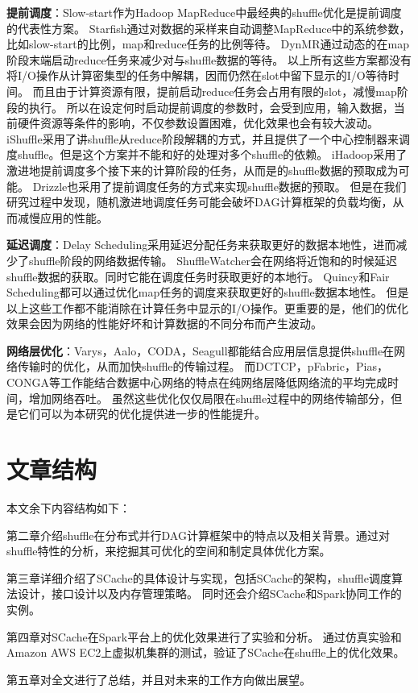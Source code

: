 \textbf{提前调度}：Slow-start作为Hadoop MapReduce\cite{hadoop}中最经典的shuffle优化是提前调度的代表性方案。
Starfish\cite{starfish}通过对数据的采样来自动调整MapReduce中的系统参数，比如slow-start的比例，map和reduce任务的比例等待。
DynMR\cite{dynmr}通过动态的在map阶段末端启动reduce任务来减少对与shuffle数据的等待。
以上所有这些方案都没有将I/O操作从计算密集型的任务中解耦，因而仍然在slot中留下显示的I/O等待时间。
而且由于计算资源有限，提前启动reduce任务会占用有限的slot，减慢map阶段的执行。
所以在设定何时启动提前调度的参数时，会受到应用，输入数据，当前硬件资源等条件的影响，不仅参数设置困难，优化效果也会有较大波动。
iShuffle\cite{ishuffle}采用了讲shuffle从reduce阶段解耦的方式，并且提供了一个中心控制器来调度shuffle。但是这个方案并不能和好的处理对多个shuffle的依赖。
iHadoop\cite{ihadoop}采用了激进地提前调度多个接下来的计算阶段的任务，从而是的shuffle数据的预取成为可能。
Drizzle\cite{drizzle}也采用了提前调度任务的方式来实现shuffle数据的预取。
但是在我们研究过程中发现，随机激进地调度任务可能会破坏DAG计算框架的负载均衡，从而减慢应用的性能。

\textbf{延迟调度}：Delay Scheduling\cite{delay}采用延迟分配任务来获取更好的数据本地性，进而减少了shuffle阶段的网络数据传输。
ShuffleWatcher\cite{shufflewatcher}会在网络将近饱和的时候延迟shuffle数据的获取。同时它能在调度任务时获取更好的本地行。
Quincy\cite{quincy}和Fair Scheduling\cite{preemptive}都可以通过优化map任务的调度来获取更好的shuffle数据本地性。
但是以上这些工作都不能消除在计算任务中显示的I/O操作。更重要的是，他们的优化效果会因为网络的性能好坏和计算数据的不同分布而产生波动。

\textbf{网络层优化}：Varys\cite{varys}，Aalo\cite{aalo}，CODA\cite{coda}，Seagull\cite{seagull}都能结合应用层信息提供shuffle在网络传输时的优化，从而加快shuffle的传输过程。
而DCTCP\cite{dctcp}，pFabric\cite{pfabric}，Pias\cite{pias}，CONGA\cite{conga}等工作能结合数据中心网络的特点在纯网络层降低网络流的平均完成时间，增加网络吞吐。
虽然这些优化仅仅局限在shuffle过程中的网络传输部分，但是它们可以为本研究的优化提供进一步的性能提升。

\section{文章结构}

本文余下内容结构如下：

第二章介绍shuffle在分布式并行DAG计算框架中的特点以及相关背景。通过对shuffle特性的分析，来挖掘其可优化的空间和制定具体优化方案。

第三章详细介绍了SCache的具体设计与实现，包括SCache的架构，shuffle调度算法设计，接口设计以及内存管理策略。
同时还会介绍SCache和Spark协同工作的实例。

第四章对SCache在Spark平台上的优化效果进行了实验和分析。
通过仿真实验和Amazon AWS EC2上虚拟机集群的测试，验证了SCache在shuffle上的优化效果。

第五章对全文进行了总结，并且对未来的工作方向做出展望。







